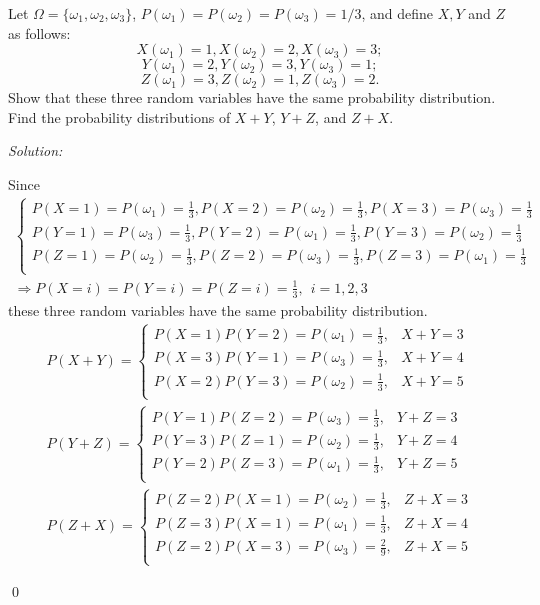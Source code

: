 \documentclass[12pt]{article}
\newenvironment{problem}[2][Problem]{\begin{trivlist}
\item[\hskip \labelsep {\bfseries #1}\hskip \labelsep {\bfseries #2.}]}{\end{trivlist}}
\newenvironment{sol}
    {\emph{Solution:}
    }
    {
    \qed
    }
\begin{document}




\begin{problem}{1} 
Let $\Omega=\{\omega_1,\omega_2,\omega_3\}$, $P(\omega_1)=P(\omega_2)=P(\omega_3)=1/3$, and define $X,Y$ and $Z$ as follows:
\[
X(\omega_1)=1,X(\omega_2)=2, X(\omega_3)=3;\]
\[Y(\omega_1)=2,Y(\omega_2)=3, Y(\omega_3)=1;\]
\[Z(\omega_1)=3,Z(\omega_2)=1, Z(\omega_3)=2.
\]
Show that these three random variables have the same probability distribution. Find the probability distributions of $X+Y$, $Y+Z$, and $Z+X$.
\end{problem}
\begin{sol}
Since
\begin{gather*}
\left\{\begin{array}{l}
P(X=1)=P(\omega_1)=\frac{1}{3},P(X=2)=P(\omega_2)=\frac{1}{3},P(X=3)=P(\omega_3)=\frac{1}{3}\\
P(Y=1)=P(\omega_3)=\frac{1}{3},P(Y=2)=P(\omega_1)=\frac{1}{3},P(Y=3)=P(\omega_2)=\frac{1}{3}\\
P(Z=1)=P(\omega_2)=\frac{1}{3},P(Z=2)=P(\omega_3)=\frac{1}{3},P(Z=3)=P(\omega_1)=\frac{1}{3}\\
\end{array}\right.\\
\Longrightarrow P(X=i)=P(Y=i)=P(Z=i)=\frac{1}{3},~~i=1,2,3
\end{gather*}
these three random variables have the same probability distribution.
\begin{gather*}
P(X+Y)=\left\{\begin{array}{ll}
P(X=1)P(Y=2)=P(\omega_1)=\frac{1}{3},&X+Y=3\\
P(X=3)P(Y=1)=P(\omega_3)=\frac{1}{3},&X+Y=4\\
P(X=2)P(Y=3)=P(\omega_2)=\frac{1}{3},&X+Y=5\\
\end{array}\right.\\
P(Y+Z)=\left\{\begin{array}{ll}
P(Y=1)P(Z=2)=P(\omega_3)=\frac{1}{3},&Y+Z=3\\
P(Y=3)P(Z=1)=P(\omega_2)=\frac{1}{3},&Y+Z=4\\
P(Y=2)P(Z=3)=P(\omega_1)=\frac{1}{3},&Y+Z=5\\
\end{array}\right.\\
P(Z+X)=\left\{\begin{array}{ll}
P(Z=2)P(X=1)=P(\omega_2)=\frac{1}{3},&Z+X=3\\
P(Z=3)P(X=1)=P(\omega_1)=\frac{1}{3},&Z+X=4\\
P(Z=2)P(X=3)=P(\omega_3)=\frac{2}{9},&Z+X=5\\
\end{array}\right.
\end{gather*}
\end{sol}
\end{document}
